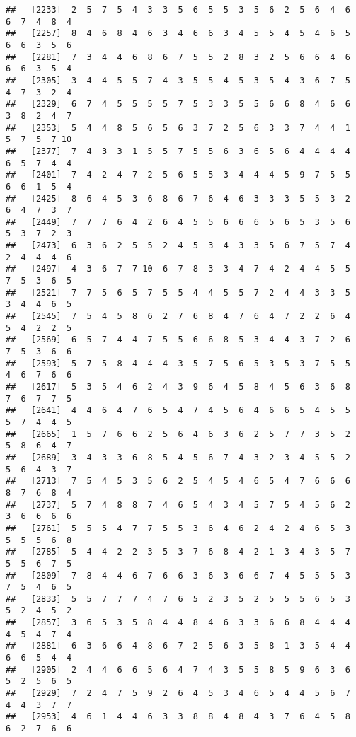 \documentclass[
]{book}
\begin{document}
\begin{verbatim}
##   [2233]  2  5  7  5  4  3  3  5  6  5  5  3  5  6  2  5  6  4  6  6  7  4  8  4
##   [2257]  8  4  6  8  4  6  3  4  6  6  3  4  5  5  4  5  4  6  5  6  6  3  5  6
##   [2281]  7  3  4  4  6  8  6  7  5  5  2  8  3  2  5  6  6  4  6  6  6  3  5  4
##   [2305]  3  4  4  5  5  7  4  3  5  5  4  5  3  5  4  3  6  7  5  4  7  3  2  4
##   [2329]  6  7  4  5  5  5  5  7  5  3  3  5  5  6  6  8  4  6  6  3  8  2  4  7
##   [2353]  5  4  4  8  5  6  5  6  3  7  2  5  6  3  3  7  4  4  1  5  7  5  7 10
##   [2377]  7  4  3  3  1  5  5  7  5  5  6  3  6  5  6  4  4  4  4  6  5  7  4  4
##   [2401]  7  4  2  4  7  2  5  6  5  5  3  4  4  4  5  9  7  5  5  6  6  1  5  4
##   [2425]  8  6  4  5  3  6  8  6  7  6  4  6  3  3  3  5  5  3  2  6  4  7  3  7
##   [2449]  7  7  7  6  4  2  6  4  5  5  6  6  6  5  6  5  3  5  6  5  3  7  2  3
##   [2473]  6  3  6  2  5  5  2  4  5  3  4  3  3  5  6  7  5  7  4  2  4  4  4  6
##   [2497]  4  3  6  7  7 10  6  7  8  3  3  4  7  4  2  4  4  5  5  7  5  3  6  5
##   [2521]  7  7  5  6  5  7  5  5  4  4  5  5  7  2  4  4  3  3  5  3  4  4  6  5
##   [2545]  7  5  4  5  8  6  2  7  6  8  4  7  6  4  7  2  2  6  4  5  4  2  2  5
##   [2569]  6  5  7  4  4  7  5  5  6  6  8  5  3  4  4  3  7  2  6  7  5  3  6  6
##   [2593]  5  7  5  8  4  4  4  3  5  7  5  6  5  3  5  3  7  5  5  4  6  7  6  6
##   [2617]  5  3  5  4  6  2  4  3  9  6  4  5  8  4  5  6  3  6  8  7  6  7  7  5
##   [2641]  4  4  6  4  7  6  5  4  7  4  5  6  4  6  6  5  4  5  5  5  7  4  4  5
##   [2665]  1  5  7  6  6  2  5  6  4  6  3  6  2  5  7  7  3  5  2  5  8  6  4  7
##   [2689]  3  4  3  3  6  8  5  4  5  6  7  4  3  2  3  4  5  5  2  5  6  4  3  7
##   [2713]  7  5  4  5  3  5  6  2  5  4  5  4  6  5  4  7  6  6  6  8  7  6  8  4
##   [2737]  5  7  4  8  8  7  4  6  5  4  3  4  5  7  5  4  5  6  2  3  6  6  6  6
##   [2761]  5  5  5  4  7  7  5  5  3  6  4  6  2  4  2  4  6  5  3  5  5  5  6  8
##   [2785]  5  4  4  2  2  3  5  3  7  6  8  4  2  1  3  4  3  5  7  5  5  6  7  5
##   [2809]  7  8  4  4  6  7  6  6  3  6  3  6  6  7  4  5  5  5  3  7  5  4  6  5
##   [2833]  5  5  7  7  7  4  7  6  5  2  3  5  2  5  5  5  6  5  3  5  2  4  5  2
##   [2857]  3  6  5  3  5  8  4  4  8  4  6  3  3  6  6  8  4  4  4  4  5  4  7  4
##   [2881]  6  3  6  6  4  8  6  7  2  5  6  3  5  8  1  3  5  4  4  6  6  5  4  4
##   [2905]  2  4  4  6  6  5  6  4  7  4  3  5  5  8  5  9  6  3  6  5  2  5  6  5
##   [2929]  7  2  4  7  5  9  2  6  4  5  3  4  6  5  4  4  5  6  7  4  4  3  7  7
##   [2953]  4  6  1  4  4  6  3  3  8  8  4  8  4  3  7  6  4  5  8  6  2  7  6  6

\end{verbatim}
\end{document}
